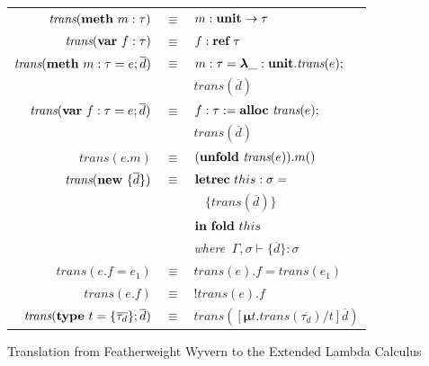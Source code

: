 \begin{figure}
\centering
\begin{tabular}{ r c l }
$\textit{trans}(\textbf{meth}~ m:\tau)$ & $\equiv$ & $m:\textbf{unit} \rightarrow \tau$ \\

$\textit{trans}(\textbf{var}~ f:\tau)$ & $\equiv$ & $f:\textbf{ref}~ \tau$ \\

$\textit{trans}(\textbf{meth}~ m:\tau = e; \overline{d})$ & $\equiv$ & $m:\tau = \boldsymbol\lambda \_:\textbf{unit}.\textit{trans}(e);$ \\
&& $\textit{trans}(\overline{d})$\\

$\textit{trans}(\textbf{var}~ f:\tau = e; \overline{d})$ & $\equiv$ & $f:\tau := \textbf{alloc}~ \textit{trans}(e);$ \\
&& $\textit{trans}(\overline{d})$\\

$\textit{trans}(e.m)$ & $\equiv$ & $(\textbf{unfold}~ \textit{trans}(e)).m()$ \\

$\textit{trans}(\textbf{new}~ \{\overline{d}\})$ & $\equiv$ & $\textbf{letrec}~this:\sigma =$\\
&&$ ~~~~ \{ \textit{trans}(\overline{d}) \}$\\
&&$ \textbf{in}~ \textbf{fold}~ this$ \\
&& \textit{where} $~ \Gamma,\sigma \vdash \{ \overline{d} \} : \sigma$ \\

$\textit{trans}(e.f=e_1)$ & $\equiv$ & $\textit{trans}(e).f=\textit{trans}(e_1)$ \\

$\textit{trans}(e.f)$ & $\equiv$ &  $!\textit{trans}(e).f$ \\

$\textit{trans}(\textbf{type}~ t = \{\overline{\tau_d}\}; \overline{d})$ & $\equiv$ & $\textit{trans}([\boldsymbol\mu t.\textit{trans}(\overline{\tau_d})/t]\overline{d})$ \\

\end{tabular}
\caption{Translation from Featherweight Wyvern to the Extended Lambda Calculus}
\label{fig:cw-translate}
\end{figure}
